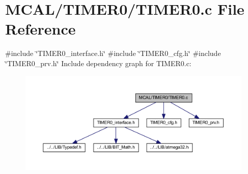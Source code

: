 \section{M\+C\+A\+L/\+T\+I\+M\+E\+R0/\+T\+I\+M\+E\+R0.c File Reference}
\label{_t_i_m_e_r0_8c}
{\ttfamily \#include \char`\"{}T\+I\+M\+E\+R0\+\_\+interface.\+h\char`\"{}}\newline
{\ttfamily \#include \char`\"{}T\+I\+M\+E\+R0\+\_\+cfg.\+h\char`\"{}}\newline
{\ttfamily \#include \char`\"{}T\+I\+M\+E\+R0\+\_\+prv.\+h\char`\"{}}\newline
Include dependency graph for T\+I\+M\+E\+R0.\+c\+:
\nopagebreak
\begin{figure}[H]
\begin{center}
\leavevmode
\includegraphics[width=350pt]{_t_i_m_e_r0_8c__incl}
\end{center}
\end{figure}
